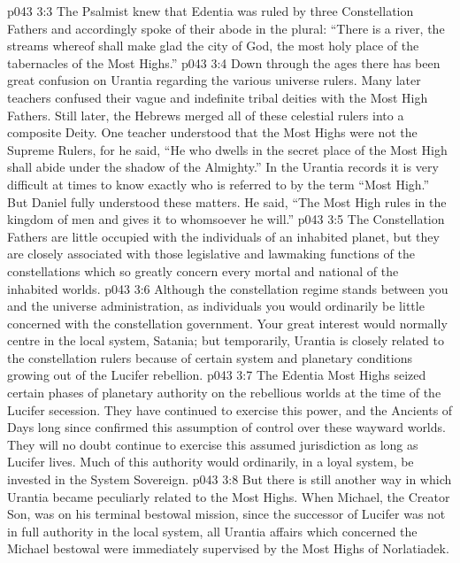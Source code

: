 \vs p043 3:3 The Psalmist knew that Edentia was ruled by three Constellation Fathers and accordingly spoke of their abode in the plural: “There is a river, the streams whereof shall make glad the city of God, the most holy place of the tabernacles of the Most Highs.”
\vs p043 3:4 \pc Down through the ages there has been great confusion on Urantia regarding the various universe rulers. Many later teachers confused their vague and indefinite tribal deities with the Most High Fathers. Still later, the Hebrews merged all of these celestial rulers into a composite Deity. One teacher understood that the Most Highs were not the Supreme Rulers, for he said, “He who dwells in the secret place of the Most High shall abide under the shadow of the Almighty.” In the Urantia records it is very difficult at times to know exactly who is referred to by the term “Most High.” But Daniel fully understood these matters. He said, “The Most High rules in the kingdom of men and gives it to whomsoever he will.”
\vs p043 3:5 \pc The Constellation Fathers are little occupied with the individuals of an inhabited planet, but they are closely associated with those legislative and lawmaking functions of the constellations which so greatly concern every mortal  and national  of the inhabited worlds.
\vs p043 3:6 Although the constellation regime stands between you and the universe administration, as individuals you would ordinarily be little concerned with the constellation government. Your great interest would normally centre in the local system, Satania; but temporarily, Urantia is closely related to the constellation rulers because of certain system and planetary conditions growing out of the Lucifer rebellion.
\vs p043 3:7 The Edentia Most Highs seized certain phases of planetary authority on the rebellious worlds at the time of the Lucifer secession. They have continued to exercise this power, and the Ancients of Days long since confirmed this assumption of control over these wayward worlds. They will no doubt continue to exercise this assumed jurisdiction as long as Lucifer lives. Much of this authority would ordinarily, in a loyal system, be invested in the System Sovereign.
\vs p043 3:8 But there is still another way in which Urantia became peculiarly related to the Most Highs. When Michael, the Creator Son, was on his terminal bestowal mission, since the successor of Lucifer was not in full authority in the local system, all Urantia affairs which concerned the Michael bestowal were immediately supervised by the Most Highs of Norlatiadek.
